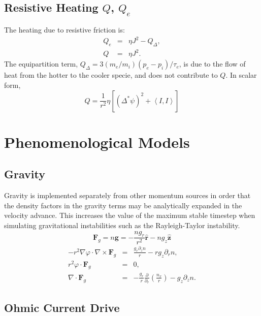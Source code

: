 \documentclass[letterpaper]{book}
\renewcommand{\vec}[1]{\ensuremath{\mathbf{#1}}}
\newcommand{\tor}{\varphi}              %
\newcommand{\F}{\vec{F}}
\newcommand{\g}{\vec{g}}
\newcommand{\grad}[1]{\nabla #1}
\renewcommand{\div}[1]{\nabla \cdot #1}
\newcommand{\curl}[1]{\nabla \times #1}
\newcommand{\gs}[1]{\Delta^* #1}
\newcommand{\ip}[2]{\left\langle  #1,#2\right\rangle}
\newcommand{\uvec}[1]{\ensuremath{\vec{\hat{#1}}}}
\begin{document}
\subsection{Resistive Heating $Q$, $Q_e$}

The heating due to resistive friction is:
\begin{eqnarray*}
  Q_e & = & \eta J^2  - Q_\Delta,\\
  Q   & = & \eta J^2.
\end{eqnarray*}
The equipartition term, $Q_\Delta = 3 (m_e/m_i) (p_e - p_i) / \tau_e$,
is due to the flow of heat from the hotter to the cooler specie, and
does not contribute to $Q$.  In scalar form,
\begin{displaymath}
  Q = \frac{1}{r^2} \eta \left[ (\gs{\psi})^2 + \ip{I}{I} \right]
\end{displaymath}


\section{Phenomenological Models \label{sec:phenom_models}}

\subsection{Gravity}

Gravity is implemented separately from other momentum sources in order
that the density factors in the gravity terms may be analytically
expanded in the velocity advance.  This increases the value of the
maximum stable timestep when simulating gravitational instabilities
such as the Rayleigh-Taylor instability.
\begin{equation}
  \label{eq:gravity}
  \F_g = n \g = -\frac{n g_r}{r^2}\uvec{r} - n g_z \uvec{z}
\end{equation}
\begin{eqnarray*}
  -r^2 \grad \tor \cdot \curl \F_g & = & \frac{g_r \partial_z n}{r} 
  - r g_z \partial_r n,
  \\
  r^2 \tor \cdot \F_g & = & 0,
  \\
  \div{\F_g} & = & - \frac{g_r}{r} \frac{\partial}{\partial_r} \left(
  \frac{n_x}{r} \right) - g_z \partial_z n.
\end{eqnarray*}

\subsection{Ohmic Current Drive}
\end{document}
